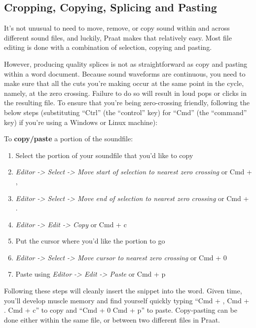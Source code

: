 \hypertarget{cropping-copying-splicing-and-pasting}{%
\subsection{Cropping, Copying, Splicing and
Pasting}\label{cropping-copying-splicing-and-pasting}}

\label{sec:cropcopy}

It's not unusual to need to move, remove, or copy sound within and
across different sound files, and luckily, Praat makes that relatively
easy. Most file editing is done with a combination of selection, copying
and pasting.

However, producing quality splices is not as straightforward as copy and
pasting within a word document. Because sound waveforms are continuous,
you need to make sure that all the cuts you're making occur at the same
point in the cycle, namely, at the zero crossing. Failure to do so will
result in loud pops or clicks in the resulting file. To ensure that
you're being zero-crossing friendly, following the below steps
(substituting ``Ctrl'' (the ``control'' key) for ``Cmd'' (the
``command'' key) if you're using a Windows or Linux machine):

To \textbf{copy/paste} a portion of the soundfile:

\begin{enumerate}
\def\labelenumi{\arabic{enumi}.}
\tightlist
\item
  Select the portion of your soundfile that you'd like to copy
\item
  \emph{Editor -\textgreater{} Select -\textgreater{} Move start of
  selection to nearest zero crossing} or Cmd + ,
\item
  \emph{Editor -\textgreater{} Select -\textgreater{} Move end of
  selection to nearest zero crossing} or Cmd + .
\item
  \emph{Editor -\textgreater{} Edit -\textgreater{} Copy} or Cmd + c
\item
  Put the cursor where you'd like the portion to go
\item
  \emph{Editor -\textgreater{} Select -\textgreater{} Move cursor to
  nearest zero crossing} or Cmd + 0
\item
  Paste using \emph{Editor -\textgreater{} Edit -\textgreater{} Paste}
  or Cmd + p
\end{enumerate}

Following these steps will cleanly insert the snippet into the word.
Given time, you'll develop muscle memory and find yourself quickly
typing ``Cmd + , Cmd + . Cmd + c'' to copy and ``Cmd + 0 Cmd + p'' to
paste. Copy-pasting can be done either within the same file, or between
two different files in Praat.

